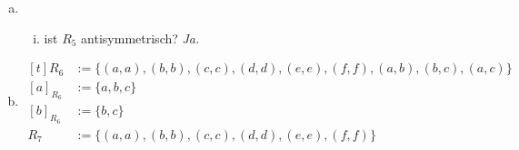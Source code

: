 \documentclass[10pt, oneside]{article}
\begin{document}
\begin{enumerate}[(a)]
    \item
        \begin{enumerate}[i)]
            \item ist $R_5$ antisymmetrisch? \textit{Ja.}
        \end{enumerate}
    \item
        $\begin{aligned}[t]
            R_6 &:= \{(a, a), (b, b), (c, c), (d, d), (e, e), (f, f), (a, b), (b, c), (a, c)\} \\
            [a]_{R_6} &:= \{a, b, c\} \\
            [b]_{R_6} &:= \{b, c\} \\
            R_7 &:= \{(a, a), (b, b), (c, c), (d, d), (e, e), (f, f)\}
        \end{aligned}$
\end{enumerate}
\end{document}
